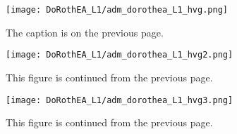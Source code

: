 \addtocounter{figure}{-1}
\begin{figure}[h!]
    \centering
    \hspace*{-1mm}
    \texttt{[image: DoRothEA\_L1/adm\_dorothea\_L1\_hvg.png]}
    \caption{\small{The caption is on the previous page.}}
    \label{fig:L1_adm_dorothea_hvgA}
\end{figure}

\addtocounter{figure}{-1}
\begin{figure}[h!]
    \centering
    \hspace*{-4mm}
    \texttt{[image: DoRothEA\_L1/adm\_dorothea\_L1\_hvg2.png]}
    \caption{\small{This figure is continued from the previous page.}}
    \label{fig:L1_adm_dorothea_hvgBC}
\end{figure}

\addtocounter{figure}{-1}
\begin{figure}[h!]
    \centering
    \hspace*{-5mm}
    \texttt{[image: DoRothEA\_L1/adm\_dorothea\_L1\_hvg3.png]}
    \caption{\small{This figure is continued from the previous page.}}
    \label{fig:L1_adm_dorothea_hvgD}
\end{figure}
